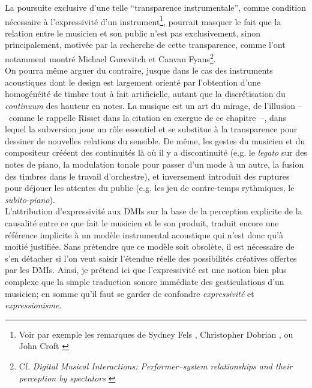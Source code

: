 \indent La poursuite exclusive d'une telle ``transparence instrumentale'', comme condition nécessaire à l'expressivité d'un instrument\footnote{Voir par exemple les remarques de Sydney Fels \cite{fels_mapping_2002} , Christopher Dobrian \cite{dobrian_e_2006} , ou John Croft \cite{croft_theses_2007}}, pourrait masquer le fait que la relation entre le musicien et son public n'est pas exclusivement, sinon principalement, motivée par la recherche de cette transparence, comme l'ont notamment montré Michael Gurevitch et Canvan Fyans\footnote{Cf. \textit{Digital Musical Interactions: Performer–system relationships and their perception by spectators} \cite{gurevich_digital_2011}}.\\
\indent On pourra même arguer du contraire, jusque dans le cas des instruments acoustiques dont le design est largement orienté par l'obtention d'une homogénéité de timbre tout à fait artificielle, autant que la discrétisation du \textit{continuum} des hauteur en notes. La musique est un art du mirage, de l'illusion --~comme le rappelle Risset dans la citation en exergue de ce chapitre~--, dans lequel la subversion joue un rôle essentiel et se substitue à la transparence pour dessiner de nouvelles relations du sensible. De même, les gestes du musicien et du compositeur crééent des continuités là où il y a discontinuité (e.g. le \textit{legato} sur des notes de piano, la modulation tonale pour passer d'un mode à un autre, la fusion des timbres dans le travail d'orchestre),  et inversement introduit des ruptures pour déjouer les attentes du public (e.g. les jeu de contre-temps rythmiques, le \textit{subito-piano}).\\
\indent L'attribution d'expressivité aux \glspl{DMI} sur la base de la perception explicite de la causalité entre ce que fait le musicien et le son produit, traduit encore une référence implicite à un modèle instrumental acoustique qui n'est donc qu'à moitié justifiée. Sans prétendre que ce modèle soit obsolète, il est nécessaire de s'en détacher si l'on veut saisir l'étendue réelle des possibilités créatives offertes par les \glspl{DMI}. Ainsi, je prétend ici que l'expressivité est une notion bien plus complexe que la simple traduction sonore immédiate des gesticulations d'un musicien; en somme qu'il faut se garder de confondre \textit{expressivité} et \textit{expressionisme}.\\
